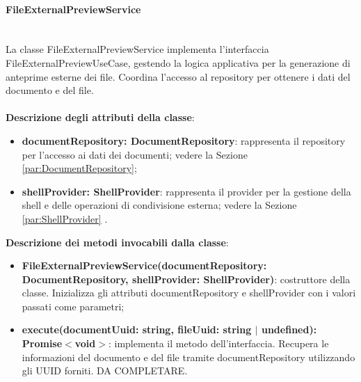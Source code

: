 \documentclass[a4paper,12pt]{article}
\begin{document}
{{{                \paragraph{FileExternalPreviewService}\label{par:FileExternalPreviewService}\mbox{}\\
                La classe FileExternalPreviewService implementa l'interfaccia FileExternalPreviewUseCase, gestendo la logica applicativa per la generazione di anteprime esterne dei file. Coordina l'accesso al repository per ottenere i dati del documento e del file.\\
                \\
                \textbf{Descrizione degli attributi della classe}:
                \begin{itemize}
                    \item \textbf{documentRepository: DocumentRepository}: rappresenta il repository per l'accesso ai dati dei documenti; vedere la Sezione \ref{par:DocumentRepository};
                    \item \textbf{shellProvider: ShellProvider}: rappresenta il provider per la gestione della shell e delle operazioni di condivisione esterna; vedere la Sezione \ref{par:ShellProvider} .
                \end{itemize}
                
              \noindent \textbf{Descrizione dei metodi invocabili dalla classe}:
                \begin{itemize}
                    \item \textbf{FileExternalPreviewService(documentRepository: DocumentRepository, shellProvider: ShellProvider)}: costruttore della classe. Inizializza gli attributi documentRepository e shellProvider con i valori passati come parametri;
                    \item \textbf{execute(documentUuid: string, fileUuid: string $|$ undefined):\\ Promise$<$void$>$}: implementa il metodo dell'interfaccia. Recupera le informazioni del documento e del file tramite documentRepository utilizzando gli UUID forniti. DA COMPLETARE.
                \end{itemize}

}}}
\end{document}
